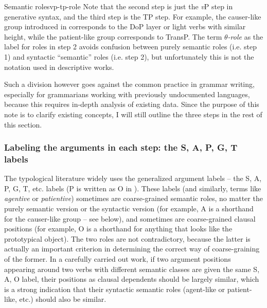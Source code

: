 \documentclass[UTF8, a4paper, oneside, scheme=plain]{ctexrep}
\newcommand*{\term}[1]{\emph{#1}}
\newcommand{\vP}{\textit{v}P}
\begin{document}
\begin{theorybox}{Semantic roles}{vp-tp-role}
    Note that the second step is just the \vP{} step in generative syntax,
    and the third step is the TP step.
    For example, the causer-like group introduced in 
    corresponds to the DoP layer or light verbs with similar height,
    while the patient-like group corresponds to TransP.
    The term \term{$\theta$-role} as the label for roles in step 2 avoids confusion 
    between purely semantic roles (i.e. step 1) and syntactic ``semantic'' roles (i.e. step 2),
    but unfortunately this is not the notation used in descriptive works.
\end{theorybox}

Such a division however goes against the common practice in grammar writing,
especially for grammarians working with previously undocumented languages,
because this requires in-depth analysis of existing data.
Since the purpose of this note is to clarify existing concepts,
I will still outline the three steps in the rest of this section.

\subsubsection{Labeling the arguments in each step: the S, A, P, G, T labels}

The typological literature widely uses the generalized argument labels -- the S, A, P, G, T, etc. labels
(P is written as O in \citet{dixon2009basic1}).
These labels (and similarly, terms like \term{agentive} or \term{patientive}) 
sometimes are coarse-grained semantic roles, 
no matter the purely semantic version or the syntactic version
(for example, A is a shorthand for the causer-like group -- see below),
and sometimes are coarse-grained clausal positions
(for example, O is a shorthand for anything that looks like the prototypical object).
The two roles are not contradictory, 
because the latter is actually an important criterion 
in determining the correct way of coarse-graining of the former.
In a carefully carried out work,
if two argument positions appearing around two verbs with different semantic classes 
are given the same S, A, O label,
their positions as clausal dependents should be largely similar,
which is a strong indication that their syntactic semantic roles 
(agent-like or patient-like, etc.)
should also be similar. 
\end{document}
